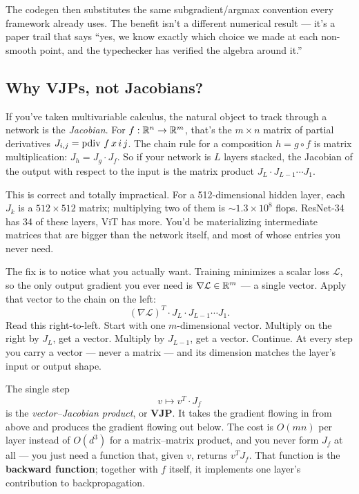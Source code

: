 The codegen then substitutes the same subgradient/argmax convention
every framework already uses. The benefit isn't a different numerical
result --- it's a paper trail that says ``yes, we know exactly which
choice we made at each non-smooth point, and the typechecker has
verified the algebra around it.''

\subsection*{Why VJPs, not Jacobians?}

If you've taken multivariable calculus, the natural object to track
through a network is the \emph{Jacobian}. For
$f : \mathbb{R}^{n} \to \mathbb{R}^{m}$, that's the $m \times n$ matrix of
partial derivatives $J_{i,j} = \operatorname{pdiv}\, f\, x\, i\, j$. The chain rule
for a composition $h = g \circ f$ is matrix multiplication:
$J_h = J_g \cdot J_f$. So if your network is $L$ layers stacked, the
Jacobian of the output with respect to the input is the matrix
product $J_L \cdot J_{L-1} \cdots J_1$.

This is correct and totally impractical. For a 512-dimensional hidden
layer, each $J_k$ is a $512 \times 512$ matrix; multiplying two of
them is $\sim 1.3 \times 10^8$ flops. ResNet-34 has 34 of these
layers, ViT has more. You'd be materializing intermediate matrices
that are bigger than the network itself, and most of whose entries
you never need.

The fix is to notice what you actually want. Training minimizes a
scalar loss $\mathcal{L}$, so the only output gradient you ever need
is $\nabla \mathcal{L} \in \mathbb{R}^{m}$ --- a single vector. Apply that
vector to the chain on the left:
\[
  (\nabla \mathcal{L})^T \cdot J_L \cdot J_{L-1} \cdots J_1.
\]
Read this right-to-left. Start with one $m$-dimensional vector.
Multiply on the right by $J_L$, get a vector. Multiply by $J_{L-1}$,
get a vector. Continue. At every step you carry a vector --- never a
matrix --- and its dimension matches the layer's input or output
shape.

The single step
\[
  v \mapsto v^T \cdot J_f
\]
is the \emph{vector--Jacobian product}, or \textbf{VJP}. It takes the
gradient flowing in from above and produces the gradient flowing out
below. The cost is $O(mn)$ per layer instead of $O(d^3)$ for a
matrix--matrix product, and you never form $J_f$ at all --- you just
need a function that, given $v$, returns $v^T J_f$. That function
is the \textbf{backward function}; together with $f$ itself, it
implements one layer's contribution to backpropagation.


